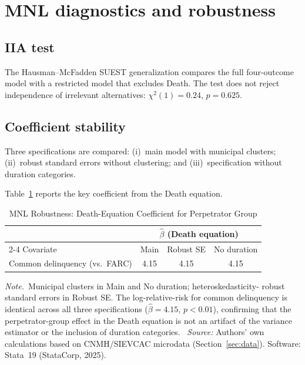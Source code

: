 \documentclass[12pt]{article}
\numberwithin{equation}{section}
\numberwithin{table}{section}
\newcommand{\tabnote}{\par\addvspace{0.4em}\noindent\emph{Note.}}
\newcommand{\tabsource}{\ \textit{Source:} Authors' own calculations based on
CNMH/SIEVCAC microdata (Section~\ref{sec:data}). Software: Stata~19
(StataCorp, 2025).}
\begin{document}
\section{MNL diagnostics and robustness}
\label{sec:mnl-diag}

\subsection{IIA test}

The Hausman--McFadden \citep{HausmanMcFadden1984} SUEST generalization
\citep{Weesie1999} compares the full four-outcome model with a restricted
model that excludes Death. The test does not reject independence of
irrelevant alternatives: $\chi^2(1)=0.24$, $p=0.625$.

\subsection{Coefficient stability}

Three specifications are compared: (i)~main model with municipal clusters;
(ii)~robust standard errors without clustering; and (iii)~specification
without duration categories.

Table~\ref{tab:robust} reports the key coefficient from the Death equation.

\begin{table}[t]
\centering
\caption{MNL Robustness: Death-Equation Coefficient for Perpetrator Group}
\label{tab:robust}
\small
\begin{tabular}{@{}lccc@{}}
\toprule
 & \multicolumn{3}{c}{$\hat\beta$ (Death equation)} \\
\cmidrule(lr){2-4}
Covariate & Main & Robust SE & No duration \\
\midrule
Common delinquency (vs.\ FARC) & 4.15 & 4.15 & 4.15 \\
\bottomrule
\end{tabular}
\tabnote\ Municipal clusters in Main and No duration; heteroskedasticity-
robust standard errors in Robust SE. The log-relative-risk for common
delinquency is identical across all three specifications ($\hat\beta=4.15$,
$p<0.01$), confirming that the perpetrator-group effect in the Death equation
is not an artifact of the variance estimator or the inclusion of duration
categories.
\tabsource
\end{table}
\end{document}
